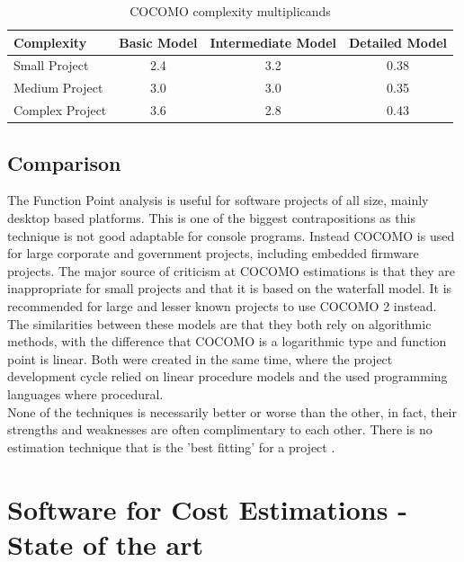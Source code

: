 \begin{table}[h]
	\centering 
	\setlength{\tabcolsep}{4pt}
	\begin{tabular}{|l|c|c|c|}\hline
		Complexity	&  Basic Model 		&  Intermediate Model	&  Detailed Model\\ \hline
		Small Project   	& 2.4      	& 3.2  					& 0.38	\\ \hline
		Medium Project 		& 3.0      	& 3.0  					& 0.35	\\ \hline
		Complex Project 	& 3.6 		& 2.8					& 0.43\\ \hline
	\end{tabular} 
	\caption{COCOMO complexity multiplicands} 
	\label{cocomo:complexity} 
\end{table}

\subsection{Comparison}

The Function Point analysis is useful for software projects of all size, mainly desktop based platforms. This is one of the biggest contrapositions as this technique is not good adaptable for console programs. Instead COCOMO is used for large corporate and government projects, including embedded firmware projects. The major source of criticism at COCOMO estimations is that they are inappropriate for small projects and that it is based on the waterfall model. It is recommended for large and lesser known projects to use COCOMO 2 instead.\\
The similarities between these models are that they both rely on algorithmic methods, with the difference that COCOMO is a logarithmic type and function point is linear. Both were created in the same time, where the project development cycle relied on linear procedure models and the used programming languages where procedural.\\
None of the techniques is necessarily better or worse than the other, in fact, their strengths and weaknesses are often complimentary to each other. There is no estimation technique that is the 'best fitting' for a project \cite{estimationanalysis}.

\section{Software for Cost Estimations - State of the art}
\label{sec:stateofart}

